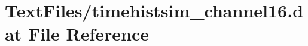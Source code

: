 \hypertarget{TextFiles_2timehistsim__channel16_8dat}{}\section{Text\+Files/timehistsim\+\_\+channel16.dat File Reference}
\label{TextFiles_2timehistsim__channel16_8dat}
